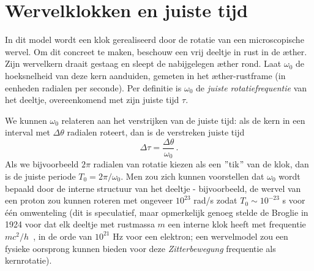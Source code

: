 \section{Wervelklokken en juiste tijd}


In dit model wordt een klok gerealiseerd door de rotatie van een microscopische wervel. Om dit concreet te maken, beschouw een vrij deeltje in
rust in de æther. Zijn wervelkern draait gestaag en sleept de nabijgelegen æther rond. Laat $\omega_0$ de hoeksnelheid van deze kern  aanduiden, gemeten in het æther-rustframe (in eenheden radialen per seconde). Per definitie is $\omega_0$ de \emph{juiste rotatiefrequentie} van het deeltje, overeenkomend met zijn juiste tijd $\tau$.

We kunnen $\omega_0$ relateren aan het verstrijken van de juiste tijd: als de kern in een interval met $\Delta \theta$ radialen roteert, dan is de verstreken juiste tijd
\[
    \Delta \tau = \frac{\Delta \theta}{\omega_0} \,.
\]
Als we bijvoorbeeld $2\pi$ radialen van rotatie kiezen als een \("\)tik\("\) van de klok, dan is de juiste periode $T_0 = 2\pi/\omega_0$. Men zou zich kunnen voorstellen dat $\omega_0$ wordt bepaald door de interne structuur van het deeltje - bijvoorbeeld, de wervel van een proton zou kunnen roteren met ongeveer $10^{23}$ rad/s zodat $T_0 \sim 10^{-23}$ s voor één omwenteling (dit is speculatief, maar opmerkelijk genoeg stelde de Broglie in 1924 voor dat elk deeltje met rustmassa $m$ een interne klok heeft met frequentie $mc^2/h$~\cite{deBroglie1924-frequency}, in de orde van $10^{21}$ Hz voor een elektron; een wervelmodel zou een fysieke oorsprong kunnen bieden voor deze \emph{Zitterbewegung} frequentie als kernrotatie).

